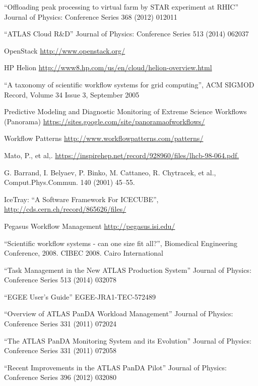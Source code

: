 \begin{thebibliography}{99}
 ``Offloading peak processing to virtual farm by STAR experiment at RHIC'' Journal of Physics: Conference Series 368 (2012) 012011

 ``ATLAS Cloud R\&D'' Journal of Physics: Conference Series 513 (2014) 062037

 OpenStack \url{http://www.openstack.org/}

 HP Helion \url{http://www8.hp.com/us/en/cloud/helion-overview.html}

 ``A taxonomy of scientific workflow systems for grid computing'', ACM SIGMOD Record, Volume 34 Issue 3, September 2005

 Predictive Modeling and Diagnostic Monitoring of Extreme Science Workflows (Panorama) \url{https://sites.google.com/site/panoramaofworkflows/}

 Workflow Patterns \url{http://www.workflowpatterns.com/patterns/}

 Mato, P., et al,. \url{https://inspirehep.net/record/928960/files/lhcb-98-064.pdf.}

 G. Barrand, I. Belyaev, P. Binko, M. Cattaneo, R. Chytracek, et al., Comput.Phys.Commun. 140
(2001) 45–55.

 IceTray: ``A Software Framework For ICECUBE'', \url{http://cds.cern.ch/record/865626/files/}

 Pegasus Workflow Management \url{http://pegasus.isi.edu/}

 ``Scientific workflow systems - can one size fit all?'', Biomedical Engineering Conference, 2008. CIBEC 2008. Cairo International

 ``Task Management in the New ATLAS Production System'' Journal of Physics: Conference Series 513 (2014) 032078

 ``EGEE User’s Guide'' EGEE-JRA1-TEC-572489

 ``Overview of ATLAS PanDA Workload Management'' Journal of Physics: Conference Series 331 (2011) 072024

 ``The ATLAS PanDA Monitoring System and its Evolution'' Journal of Physics: Conference Series 331 (2011) 072058

 ``Recent Improvements in the ATLAS PanDA Pilot'' Journal of Physics: Conference Series 396 (2012) 032080


\end{thebibliography}
